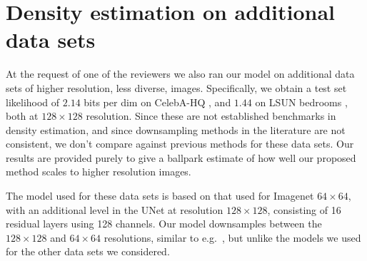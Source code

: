 \documentclass{article}
\begin{document}
\section{Density estimation on additional data sets}
At the request of one of the reviewers we also ran our model on additional data sets of higher resolution, less diverse, images. Specifically, we obtain a test set likelihood of $2.14$ bits per dim on CelebA-HQ \citep{karras2017progressive}, and $1.44$ on LSUN bedrooms \citep{yu2015lsun}, both at $128 \times 128$ resolution. Since these are not established benchmarks in density estimation, and since downsampling methods in the literature are not consistent, we don't compare against previous methods for these data sets. Our results are provided purely to give a ballpark estimate of how well our proposed method scales to higher resolution images.

The model used for these data sets is based on that used for Imagenet $64 \times 64$, with an additional level in the UNet at resolution $128 \times 128$, consisting of 16 residual layers using 128 channels. Our model downsamples between the $128 \times 128$ and $64 \times 64$ resolutions, similar to e.g.\ \cite{ho2020denoising}, but unlike the models we used for the other data sets we considered.
\end{document}
